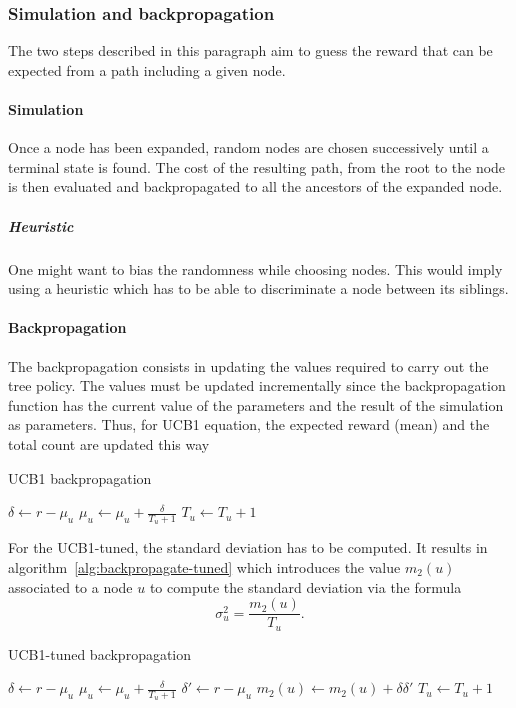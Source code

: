 \documentclass[oneside,twocolumn]{article}
\begin{document}
\subsubsection{Simulation and backpropagation}
The two steps described in this paragraph aim to guess the reward that can be
expected from a path including a given node.
\paragraph{Simulation}
Once a node has been expanded, random nodes are chosen successively until a
terminal state is found. The cost of the resulting path, from the root to the
node is then evaluated and backpropagated to all the ancestors of the expanded
node.

\subparagraph{Heuristic} One might want to bias the randomness while choosing
nodes. This would imply using a heuristic which has to be able to discriminate
a node between its siblings.

\paragraph{Backpropagation}
The backpropagation consists in updating the values required to carry out the
tree policy. The values must be updated incrementally since the backpropagation
function has the current value of the parameters and the result of the
simulation as parameters. Thus, for UCB1 equation, the expected reward (mean)
and the total count are updated this way
\begin{algorithm}
  \caption{UCB1 backpropagation}
  \begin{algorithmic}
    \State{}\(\delta \gets r - \mu_u\)
    \State{}\(\mu_u \gets \mu_u + \frac{\delta}{T_u + 1}\)
    \State{}\(T_u \gets T_u + 1\)
    \EndProcedure{}
  \end{algorithmic}
\end{algorithm}

For the UCB1-tuned, the standard deviation has to be computed. It results in
algorithm~\ref{alg:backpropagate-tuned} which introduces the value \(m_2(u)\)
associated to a node \(u\) to compute the standard deviation via the formula
\begin{equation}
  \sigma^2_u = \frac{m_2(u)}{T_u}.
\end{equation}
\begin{algorithm}
  \caption{UCB1-tuned backpropagation}\label{alg:backpropagate-tuned}
  \begin{algorithmic}
    \State{}\(\delta \gets r - \mu_u\)
    \State{}\(\mu_u \gets \mu_u + \frac{\delta}{T_u + 1}\)
    \State{}\(\delta' \gets r - \mu_u\)
    \State{}\(m_2(u) \gets m_2(u) + \delta \delta'\)
    \State{}\(T_u \gets T_u + 1\)
    \EndProcedure{}
  \end{algorithmic}
\end{algorithm}
\end{document}
